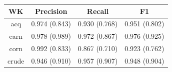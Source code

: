 
\begin{tabular}{ c | c | c | c | }
	 WK  & Precision & Recall & F1   \\ \hline	
	 acq &  0.974 (0.843) & 0.930 (0.768) & 0.951 (0.802) \\ \hline
	 earn &   0.978 (0.989)& 0.972 (0.867)& 0.976 (0.925)  \\ \hline
	 corn &   0.992 (0.833) & 0.867 (0.710) &  0.923 (0.762) \\ \hline
	 crude &   0.946 (0.910) & 0.957 (0.907) &  0.948 (0.904) \\ \hline
	
\end{tabular}

